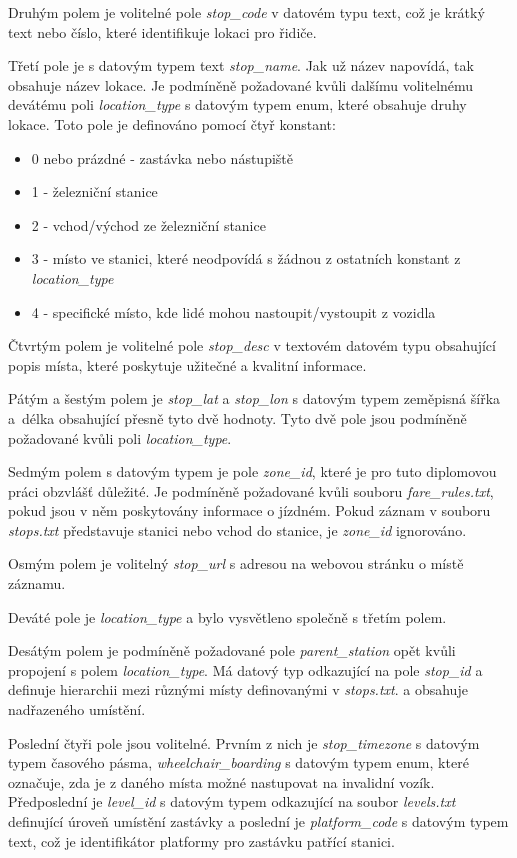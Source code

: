 Druhým polem je volitelné pole \textit{stop\_code} v datovém typu text, což je krátký text nebo číslo, 
které identifikuje lokaci pro řidiče. 

Třetí pole je s datovým typem text \textit{stop\_name}. Jak už název napovídá, tak obsahuje název lokace. 
Je podmíněně požadované kvůli dalšímu volitelnému devátému poli \textit{location\_type} s datovým typem enum, 
které obsahuje druhy lokace.
Toto pole je definováno pomocí čtyř konstant:
\begin{itemize} 
\item 0 nebo prázdné - zastávka nebo nástupiště
\item 1 - železniční stanice 
\item 2 - vchod/východ ze železniční stanice 
\item 3 - místo ve stanici, které neodpovídá s žádnou z ostatních konstant z \textit{location\_type} 
\item 4 - specifické místo, kde lidé mohou nastoupit/vystoupit z vozidla
\end{itemize}

Čtvrtým polem je volitelné pole \textit{stop\_desc} v textovém datovém typu obsahující popis místa, 
které poskytuje užitečné a kvalitní informace.

Pátým a šestým polem je \textit{stop\_lat} a \textit{stop\_lon} s datovým typem zeměpisná šířka a~délka
obsahující přesně tyto dvě hodnoty. Tyto dvě pole jsou podmíněně požadované kvůli poli \textit{location\_type}.

Sedmým polem s datovým typem  je pole \textit{zone\_id}, které je pro tuto diplomovou práci obzvlášť důležité.
Je podmíněně požadované kvůli  souboru\- \textit{fare\_rules.txt}, pokud jsou v něm poskytovány informace o jízdném.
Pokud záznam v  souboru \textit{stops.txt} představuje stanici nebo vchod do stanice, je \textit{zone\_id} ignorováno.

Osmým polem je volitelný \textit{stop\_url} s  adresou na webovou stránku o místě záznamu.

Deváté pole je \textit{location\_type} a bylo vysvětleno společně s třetím polem.

Desátým polem je podmíněně požadované pole \textit{parent\_station} opět kvůli propojení s polem \textit{location\_type}.
Má datový typ  odkazující na pole \textit{stop\_id} a definuje hierarchii mezi různými místy definovanými v \textit{stops.txt}. 
a obsahuje  nadřazeného umístění.

Poslední čtyři pole jsou volitelné. Prvním z nich je \textit{stop\_timezone} s datovým typem časového pásma,
\textit{wheelchair\_boarding} s datovým typem enum, které označuje, zda je z daného místa možné nastupovat na invalidní vozík.
Předposlední je \textit{level\_id} s datovým typem  odkazující na soubor \textit{levels.txt} defi\-nující úroveň
umístění zastávky a poslední je \textit{platform\_code} s datovým typem text, 
což je identifikátor platformy pro zastávku patřící stanici.

